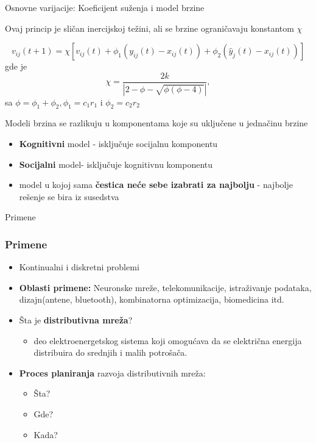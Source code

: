 \documentclass{beamer}
\begin{document}
\begin{frame}{Osnovne varijacije: Koeficijent suženja i model brzine}

Ovaj princip je sličan inercijskoj težini, ali se brzine ograničavaju konstantom $\chi$

\[v_{ij} (t + 1) = \chi[v_{ij} (t) + \phi_1 (y_{ij} (t) - x_{ij} (t)) + \phi_2 (\hat{y}_j (t) - x_{ij} (t))]\]
gde je $$\chi = \frac{2k}{|2-\phi-\sqrt{\phi(\phi-4)}|},$$sa $\phi = \phi_1 +  \phi_2 , \phi_1 = c_1r_1$ i $\phi_2 = c_2r_2$\

Modeli brzina se razlikuju u komponentama koje su uključene u jednačinu brzine
\begin{itemize}
    \item \textbf{Kognitivni} model - isključuje socijalnu komponentu
    \item \textbf{Socijalni} model- isključuje kognitivnu komponentu
    \item model u kojoj sama \textbf{čestica neće sebe izabrati za najbolju} - najbolje rešenje se bira iz susedstva
    
\end{itemize}

\end{frame}

\begin{frame}{Primene}

\frametitle{Primene}
\begin{itemize}
\item Kontinualni i diskretni problemi
\item \textbf{Oblasti primene:} Neuronske mreže, telekomunikacije, istraživanje podataka, dizajn(antene, bluetooth), kombinatorna optimizacija, biomedicina itd.
\item Šta je \textbf{distributivna mreža}?
\begin{itemize}
    \item deo elektroenergetskog sistema koji omogućava da se električna energija distribuira do srednjih i malih potrošača. 
\end{itemize}
\item \textbf{Proces planiranja} razvoja distributivnih mreža:
\begin{itemize}
    \item Šta?
    \item Gde? 
    \item Kada?
\end{itemize}

\end{itemize}


\end{frame}
\end{document}
